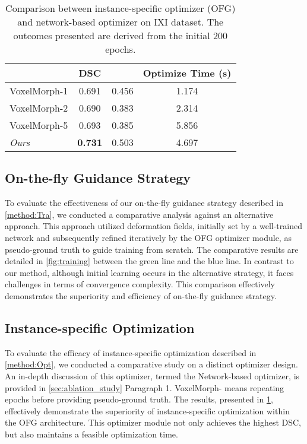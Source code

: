 \documentclass[10pt,twocolumn,letterpaper]{article}
\begin{document}
\begin{table}
\begin{center}
{\small{
    \begin{tabular}{lccc}
\toprule
     & DSC &  & Optimize Time (s) \\
    \midrule
    VoxelMorph-1 & 0.691 & 0.456 & 1.174 \\
    VoxelMorph-2 & 0.690 & 0.383 & 2.314 \\
    VoxelMorph-5 & 0.693 & 0.385 & 5.856 \\
    \midrule
    \textit{Ours} & \textbf{0.731} & 0.503 & 4.697 \\
    \bottomrule
    \end{tabular}
}}
\end{center}
\caption{Comparison between instance-specific optimizer (OFG) and network-based optimizer on IXI dataset\cite{ixi}. The outcomes presented are derived from the initial 200 epochs.}
\label{tab:ins}
\end{table}

\subsection{On-the-fly Guidance Strategy}
To evaluate the effectiveness of our on-the-fly guidance strategy described in \cref{method:Tra}, we conducted a comparative analysis against an alternative approach. This approach utilized deformation fields, initially set by a well-trained network and subsequently refined iteratively by the OFG optimizer module, as pseudo-ground truth to guide training from scratch. The comparative results are detailed in \cref{fig:training} between the green line and the blue line. In contrast to our method, although initial learning occurs in the alternative strategy, it faces challenges in terms of convergence complexity. This comparison effectively demonstrates the superiority and efficiency of on-the-fly guidance strategy.






\subsection{Instance-specific Optimization}
To evaluate the efficacy of instance-specific optimization described in \cref{method:Opt}, we conducted a comparative study on a distinct optimizer design. An in-depth discussion of this optimizer, termed the Network-based optimizer, is provided in \cref{sec:ablation_study} Paragraph 1. VoxelMorph- means repeating  epochs before providing pseudo-ground truth. The results, presented in \cref{tab:ins}, effectively demonstrate the superiority of instance-specific optimization within the OFG architecture. This optimizer module not only achieves the highest DSC, but also maintains a feasible optimization time.
\end{document}
